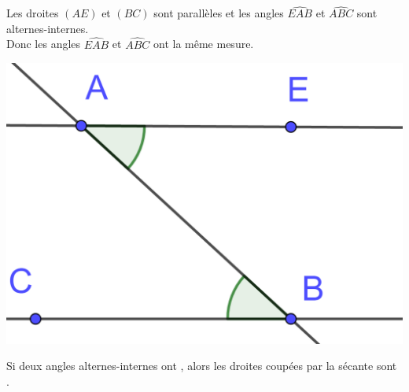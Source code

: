 \documentclass[12pt,a4paper]{article}
\begin{document}
\begin{myex}
	
	
	\begin{multicols}{2}
		Les droites $(AE)$ et $(BC)$ sont parallèles et les angles $\widehat{EAB}$ et $\widehat{ABC}$ sont alternes-internes. \\
		
		Donc les angles $\widehat{EAB}$ et $\widehat{ABC}$ ont la même mesure.
		
		\begin{center}
			\includegraphics[scale=0.15]{alt_int2}
		\end{center}
	\end{multicols}
\end{myex}


\begin{myprop}
	Si deux angles alternes-internes ont , alors les droites coupées par la sécante sont .
\end{myprop}
\end{document}
